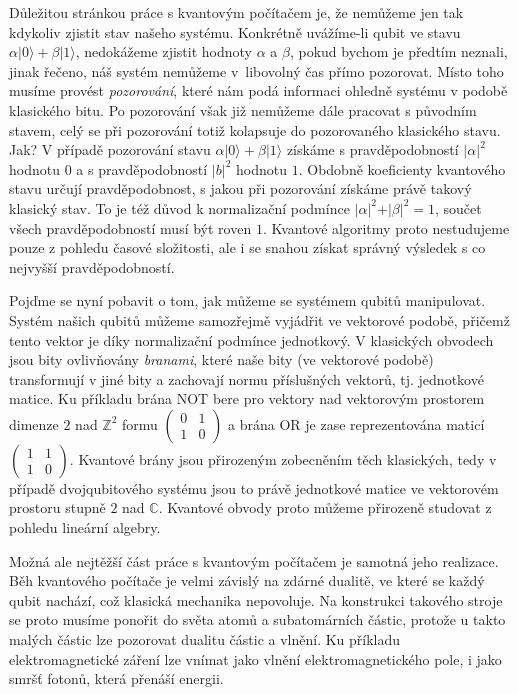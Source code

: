 \documentclass[12pt]{report}
\begin{document}
Důležitou stránkou práce s kvantovým počítačem je, že nemůžeme jen tak kdykoliv zjistit stav našeho systému. Konkrétně uvážíme-li qubit ve stavu $ \alpha \vert 0 \rangle + \beta \vert 1 \rangle$, nedokážeme zjistit hodnoty $\alpha$ a $\beta$, pokud bychom je předtím neznali, jinak řečeno, náš systém nemůžeme v~libovolný čas přímo pozorovat. Místo toho musíme provést \textit{pozorování}, které nám podá informaci ohledně systému v podobě klasického bitu. Po pozorování však již nemůžeme dále pracovat s původním stavem, celý se při pozorování totiž kolapsuje do pozorovaného klasického stavu. Jak? V případě pozorování stavu $\alpha \vert 0 \rangle + \beta \vert 1 \rangle$ získáme s pravděpodobností $\vert \alpha \vert ^2$ hodnotu $0$ a s pravděpodobností $\vert b \vert ^2$ hodnotu $1$. Obdobně koeficienty kvantového stavu určují pravděpodobnost, s jakou při pozorování získáme právě takový klasický stav. To je též důvod k normalizační podmínce $\vert \alpha \vert ^2 + \vert \beta \vert ^2 = 1$, součet všech pravděpodobností musí být roven $1$. Kvantové algoritmy proto nestudujeme pouze z pohledu časové složitosti, ale i se snahou získat správný výsledek s co nejvyšší pravděpodobností. 

Pojďme se nyní pobavit o tom, jak můžeme se systémem qubitů manipulovat. Systém našich qubitů můžeme samozřejmě vyjádřit ve vektorové podobě, přičemž tento vektor je díky normalizační podmínce jednotkový. V klasických obvodech jsou bity ovlivňovány \textit{branami}, které naše bity (ve vektorové podobě) transformují v jiné bity a zachovají normu příslušných vektorů, tj. jednotkové matice. Ku příkladu brána NOT bere pro vektory nad vektorovým prostorem dimenze $2$ nad $\mathbb{Z}^2$ formu $\begin{pmatrix}
0 & 1\\
1 & 0
\end{pmatrix}$ a brána OR je zase reprezentována maticí $\begin{pmatrix}
1 & 1\\
1 & 0
\end{pmatrix}$. Kvantové brány jsou přirozeným zobecněním těch klasických, tedy v případě dvojqubitového systému jsou to právě jednotkové matice ve vektorovém prostoru stupně $2$ nad $\mathbb{C}$. Kvantové obvody proto můžeme přirozeně studovat z pohledu lineární algebry.

Možná ale nejtěžší část práce s kvantovým počítačem je samotná jeho realizace. Běh kvantového počítače je velmi závislý na zdárné dualitě, ve které se každý qubit nachází, což klasická mechanika nepovoluje. Na konstrukci takového stroje se proto musíme ponořit do světa atomů a subatomárních částic, protože u takto malých částic lze pozorovat dualitu částic a vlnění. Ku příkladu elektromagnetické záření lze vnímat jako vlnění elektromagnetického pole, i jako smršť fotonů, která přenáší energii. 
\end{document}
